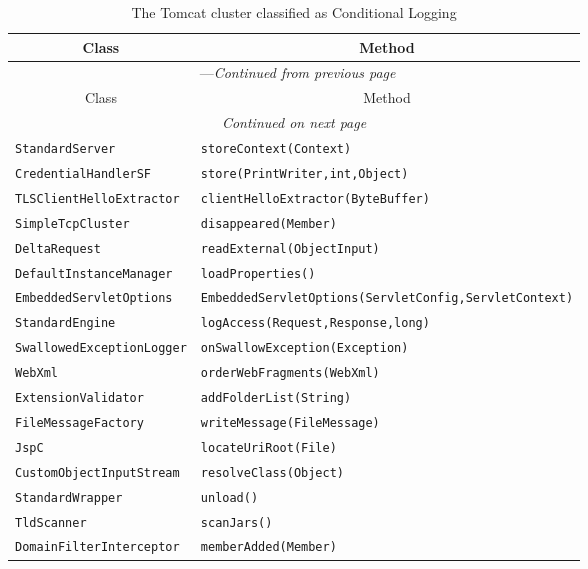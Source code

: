 \begin{center}
\begin{longtable}{ll}
\caption{The Tomcat cluster classified as Conditional Logging}\\
\toprule\multicolumn{1}{c}{Class}&\multicolumn{1}{c}{Method}\\\midrule
\endfirsthead

\multicolumn{2}{c}{\tablename\ \thetable{}---\textit{Continued from previous page}} \\\midrule
\multicolumn{1}{c}{Class}&\multicolumn{1}{c}{Method}\\\midrule
\endhead
\multicolumn{2}{c}{\textit{Continued on next page}}\\\midrule
\endfoot
\bottomrule
\endlastfoot
 \lstinline/StandardServer/&{\lstinline/storeContext(Context)/}\\
 \lstinline/CredentialHandlerSF/&{\lstinline/store(PrintWriter,int,Object)/}\\
 \lstinline/TLSClientHelloExtractor/&{\lstinline/clientHelloExtractor(ByteBuffer)/}\\
 \lstinline/SimpleTcpCluster/&{\lstinline/disappeared(Member)/}\\
 \lstinline/DeltaRequest/&{\lstinline/readExternal(ObjectInput)/}\\
 \lstinline/DefaultInstanceManager/&{\lstinline/loadProperties()/}\\
 \lstinline/EmbeddedServletOptions/&{\lstinline/EmbeddedServletOptions(ServletConfig,ServletContext)/}\\
 \lstinline/StandardEngine/&{\lstinline/logAccess(Request,Response,long)/}\\
 \lstinline/SwallowedExceptionLogger/&{\lstinline/onSwallowException(Exception)/}\\
 \lstinline/WebXml/&{\lstinline/orderWebFragments(WebXml)/}\\
 \lstinline/ExtensionValidator/&{\lstinline/addFolderList(String)/}\\
 \lstinline/FileMessageFactory/&{\lstinline/writeMessage(FileMessage)/}\\
 \lstinline/JspC/&{\lstinline/locateUriRoot(File)/}\\
 \lstinline/CustomObjectInputStream/&{\lstinline/resolveClass(Object)/}\\
 \lstinline/StandardWrapper/&{\lstinline/unload()/}\\
 \lstinline/TldScanner/&{\lstinline/scanJars()/}\\
 \lstinline/DomainFilterInterceptor/&{\lstinline/memberAdded(Member)/}\\

\end{longtable}
\end{center}

